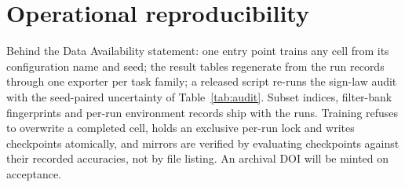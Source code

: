 \section{Operational reproducibility}\label{app:repro}

 Behind the Data Availability statement: one entry point trains
any cell from its configuration name and seed; the result tables regenerate
from the run records through one exporter per task family; a released script
re-runs the sign-law audit with the seed-paired uncertainty of
Table~\ref{tab:audit}. Subset indices, filter-bank fingerprints and per-run
environment records ship with the runs. Training refuses to overwrite a
completed cell, holds an exclusive per-run lock and writes checkpoints
atomically, and mirrors are verified by evaluating checkpoints against their
recorded accuracies, not by file listing. An archival DOI will be minted on
acceptance.
